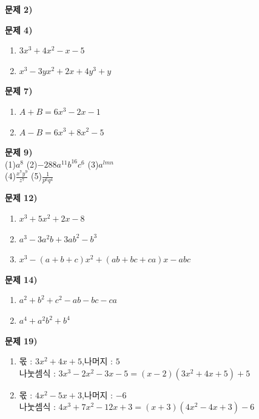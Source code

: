\documentclass{oblivoir}
\newcounter{num}
\newcommand\an[1]{\par\bigskip\noindent\textbf{문제 #1)}\\}
\begin{document}
%
\an{2}

%
\an{4}
\begin{enumerate}
\vspace{-20pt}
\item
\(3x^3+4x^2-x-5\)
\item
\(x^3-3yx^2+2x+4y^3+y\)
\end{enumerate}

%
\an{7}
\vspace{-20pt}
\begin{enumerate}
\item
\(A+B=6x^3-2x-1\)
\item
\(A-B=6x^3+8x^2-5\)
\end{enumerate}

%
\an{9}
(1)\:\:\(a^8\)
(2)\:\:\(-288a^{11}b^{16}c^6\)
(3)\:\:\(a^{lmn}\)\\
(4)\:\:\(\frac{x^7y^9}{z^7}\)
(5)\:\:\(\frac1{p^6q^4}\)
\medskip

%
\an{12}
\begin{enumerate}
\vspace{-20pt}
\item
\(x^3+5x^2+2x-8\)
\item
\(a^3-3a^2b+3ab^2-b^3\)
\item
\(x^3-(a+b+c)x^2+(ab+bc+ca)x-abc\)
\end{enumerate}

%
\an{14}
\begin{enumerate}
\vspace{-20pt}
\item
\(a^2+b^2+c^2-ab-bc-ca\)
\item
\(a^4+a^2b^2+b^4\)
\end{enumerate}

%
\an{19}
\begin{enumerate}
\item
몫 : \(3x^2+4x+5\),\quad 나머지 : \(5\)\\
나눗셈식 : \(3x^3-2x^2-3x-5=(x-2)(3x^2+4x+5)+5\)
\item
몫 : \(4x^2-5x+3\),\quad 나머지 : \(-6\)\\
나눗셈식 : \(4x^3+7x^2-12x+3=(x+3)(4x^2-4x+3)-6\)
\end{enumerate}
\end{document}
